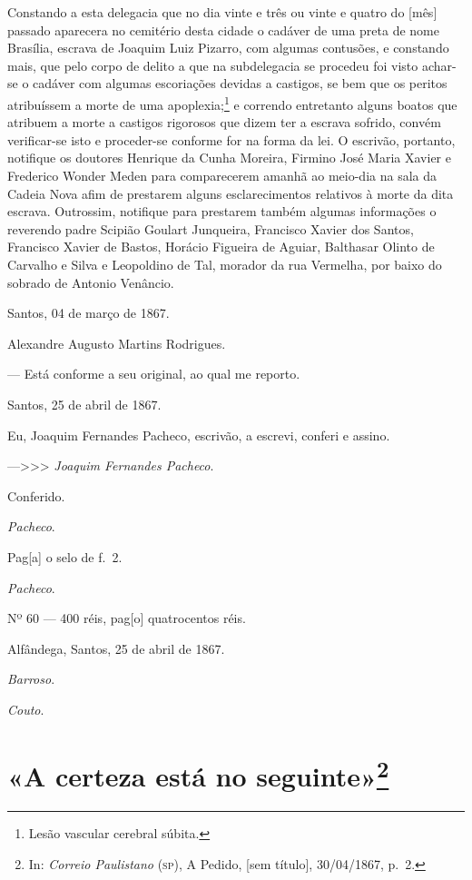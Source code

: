 Constando a esta delegacia que no dia vinte e três ou vinte e quatro do
{[}mês{]} passado aparecera no cemitério desta cidade o cadáver de uma
preta de nome Brasília, escrava de Joaquim Luiz Pizarro, com algumas
contusões, e constando mais, que pelo corpo de delito a que na
subdelegacia se procedeu foi visto achar-se o cadáver com algumas
escoriações devidas a castigos, se bem que os peritos atribuíssem a
morte de uma apoplexia;\footnote{ Lesão vascular cerebral súbita.} e
correndo entretanto alguns boatos que atribuem a morte a castigos
rigorosos que dizem ter a escrava sofrido, convém verificar-se isto e
proceder-se conforme for na forma da lei. O escrivão, portanto, notifique
os doutores Henrique da Cunha Moreira, Firmino José Maria Xavier e
Frederico Wonder Meden para comparecerem amanhã ao meio-dia na sala da
Cadeia Nova afim de prestarem alguns esclarecimentos relativos à morte
da dita escrava. Outrossim, notifique para prestarem também algumas
informações o reverendo padre Scipião Goulart Junqueira, Francisco
Xavier dos Santos, Francisco Xavier de Bastos, Horácio Figueira de
Aguiar, Balthasar Olinto de Carvalho e Silva e Leopoldino de Tal,
morador da rua Vermelha, por baixo do sobrado de Antonio Venâncio.
\begin{flushright}
Santos, 04 de março de 1867.

Alexandre Augusto Martins Rodrigues.

--- Está conforme a seu original, ao qual me reporto.

Santos, 25 de abril de 1867.

Eu, Joaquim Fernandes Pacheco, escrivão, a escrevi, conferi e assino.
\end{flushright}
---\textgreater\textgreater\textgreater{} \emph{Joaquim Fernandes
Pacheco}.

Conferido.

\emph{Pacheco}.

Pag{[}a{]} o selo de f.~2.

\emph{Pacheco}.

Nº 60 --- 400 réis, pag{[}o{]} quatrocentos réis.

Alfândega, Santos, 25 de abril de 1867.

\emph{Barroso}.

\emph{Couto}.

\chapter{«A certeza está no seguinte»\footnote{In: 
  \emph{Correio Paulistano} (\textsc{sp}), A Pedido,
  {[}sem título{]}, 30/04/1867, p.~2.}}

